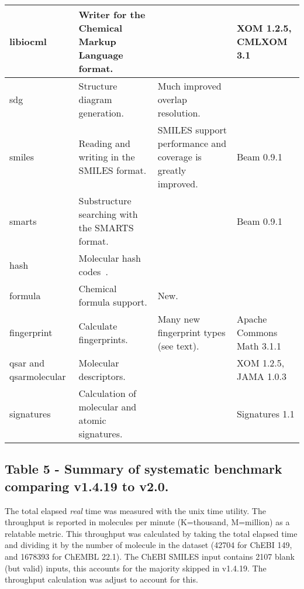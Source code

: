 \documentclass[doublespacing]{bmcart}
\def \cdkversion {v2.0}
\begin{document}
\begin{backmatter}
\begin{minipage}{1\textwidth}
\begin{tabular}{lp{3cm}p{3cm}l}
  libiocml                   & Writer for the Chemical Markup Language format. & & XOM 1.2.5, CMLXOM 3.1~\cite{Murray-Rust2011} \\ \hline
  sdg                        & Structure diagram generation.  & Much improved overlap resolution. & \\ \hline
  smiles                     & Reading and writing in the SMILES format. & SMILES support performance and coverage is greatly improved. & Beam 0.9.1~\cite{Beam} \\ \hline
  smarts                     & Substructure searching with the SMARTS format. & & Beam 0.9.1~\cite{Beam} \\ \hline
  hash                       & Molecular hash codes~\cite{Ihlenfeldt94}. & & \\ \hline
  formula                    & Chemical formula support. & New. & \\ \hline
  fingerprint                & Calculate fingerprints. & Many new fingerprint types (see text). & Apache Commons Math 3.1.1 \\ \hline
  qsar and qsarmolecular                       & Molecular descriptors.  & & XOM 1.2.5, JAMA 1.0.3~\cite{Hicklin2012} \\ \hline
  signatures                 & Calculation of molecular and atomic signatures. & & Signatures 1.1 \\ \hline
    \end{tabular}
    \end{minipage}


\subsection*{Table 5 - Summary of systematic benchmark comparing v1.4.19 to \cdkversion{}.}\label{tab:benchmark}
  The total elapsed \textit{real} time was measured with the unix time utility. The 
  throughput is reported in molecules per minute (K=thousand, M=million) as a 
  relatable metric.
  This throughput was calculated by taking the total elapsed
  time and dividing it by the number of molecule in the dataset (42704 for 
  ChEBI 149, and 1678393 for ChEMBL 22.1). The ChEBI SMILES input contains 
  2107 blank (but valid) inputs, this accounts for the majority skipped 
  in v1.4.19. The throughput calculation was adjust to account for this.


\end{backmatter}
\end{document}
